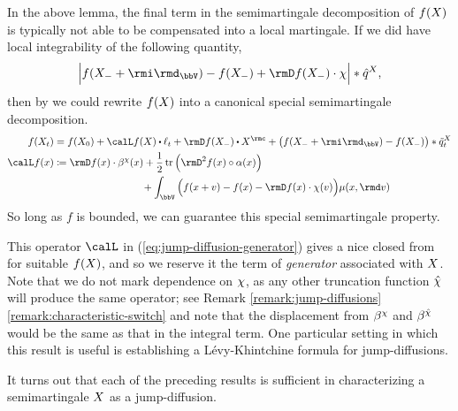 In the above lemma, the final term in the semimartingale decomposition of $f(X)$ is typically not able to be compensated into a local martingale.
If we did have local integrability of the following quantity,
\begin{equation*}
  \Big| f(\X_-+\id_\vecSpace) - f(\X_-) + \Der f(\X_-) \cdot \trunc \Big| \ast \predproj{\jumpMeas^\X},
\end{equation*}
then by \cite[Proposition II.1.28]{jacod2003} we could rewrite $f(X)$ into a canonical special semimartingale decomposition.
\begin{equation}
  \label{eq:jump-diffusion-generator}
  \begin{aligned}
    f(\X_t) &= f(\X_0) + \generator f(\X) \shortInt \leb_t + \Der f(\X_-) \shortInt \X^\rmc + \big( f(\X_- + \id_\vecSpace) - f(\X_-) \big) \ast \compensate{\jumpMeas^\X}_t \\
    \generator f(\stateVar) &\defeq \begin{aligned}[t]
      &\Der f(\stateVar) \cdot \affDrift^\trunc(\stateVar) + \frac12 \tr\Big( \Hess f(\stateVar) \circ \affDiff(\stateVar) \Big) \\
      &\hspace{25mm}+ \int_\vecSpace \Big( f(\stateVar + \markVar) - f(\stateVar) - \Der f(\stateVar) \cdot \trunc(\markVar) \Big) \affJump(\stateVar, \rmd\markVar)
    \end{aligned}
  \end{aligned}
\end{equation}
So long as $f$ is bounded, we can guarantee this special semimartingale property.



This operator $\generator$ in (\ref{eq:jump-diffusion-generator}) gives a nice closed from for suitable $f(X)$, and so we reserve it the term of \emph{generator} associated with $X$.
Note that we do not mark dependence on $\chi$, as any other truncation function $\hat{\chi}$ will produce the same operator; see Remark \ref{remark:jump-diffusions}\ref{remark:characteristic-switch} and note that the displacement from $\beta^\chi$ and $\beta^{\hat{\chi}}$ would be the same as that in the integral term.
One particular setting in which this result is useful is establishing a L\'evy-Khintchine formula for jump-diffusions.



It turns out that each of the preceding results is sufficient in characterizing a semimartingale $X$ as a jump-diffusion.


